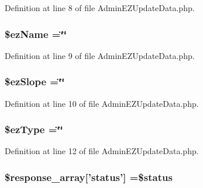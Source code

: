 Definition at line 8 of file Admin\-E\-Z\-Update\-Data.\-php.

\hypertarget{_admin_e_z_update_data_8php_a57a9615262224b8dda435a084ba02406}{
\subsubsection[{\$ez\-Name}]{\setlength{\rightskip}{0pt plus 5cm}\${\bf ez\-Name} =\char`\"{}\char`\"{}}}\label{_admin_e_z_update_data_8php_a57a9615262224b8dda435a084ba02406}


Definition at line 9 of file Admin\-E\-Z\-Update\-Data.\-php.

\hypertarget{_admin_e_z_update_data_8php_a1efbb279669bdab5d5eaff4f289c71a2}{
\subsubsection[{\$ez\-Slope}]{\setlength{\rightskip}{0pt plus 5cm}\$ez\-Slope =\char`\"{}\char`\"{}}}\label{_admin_e_z_update_data_8php_a1efbb279669bdab5d5eaff4f289c71a2}


Definition at line 10 of file Admin\-E\-Z\-Update\-Data.\-php.

\hypertarget{_admin_e_z_update_data_8php_aee528badcb788c913ffab530a5b876cf}{
\subsubsection[{\$ez\-Type}]{\setlength{\rightskip}{0pt plus 5cm}\$ez\-Type =\char`\"{}\char`\"{}}}\label{_admin_e_z_update_data_8php_aee528badcb788c913ffab530a5b876cf}


Definition at line 12 of file Admin\-E\-Z\-Update\-Data.\-php.

\hypertarget{_admin_e_z_update_data_8php_acd0903a7a32e8397aefd0ce8b7dbd1ab}{
\subsubsection[{\$response\-\_\-array}]{\setlength{\rightskip}{0pt plus 5cm}\$response\-\_\-array\mbox{[}'status'\mbox{]} =\$status}}\label{_admin_e_z_update_data_8php_acd0903a7a32e8397aefd0ce8b7dbd1ab}


